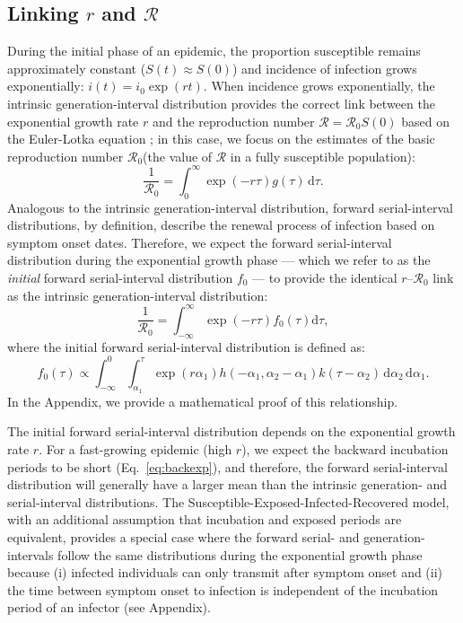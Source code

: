 \documentclass[12pt]{article}
\newcommand{\eref}[1]{Eq.~\ref{eq:#1}}
\newcommand{\Rx}[1]{\ensuremath{{\mathcal R}_{#1}}\xspace}
\newcommand{\Ro}{\Rx{0}}
\newcommand{\RR}{\ensuremath{{\mathcal R}}\xspace}
\newcommand{\dd}[1]{\ensuremath{\, \mathrm{d}#1}}
\newcommand{\dtau}{\dd{\tau}}
\begin{document}
\subsection{Linking $r$ and \RR}

During the initial phase of an epidemic, the proportion susceptible remains approximately constant ($S(t) \approx S(0)$) and incidence of infection grows exponentially: $i(t)=i_0\exp(rt)$.
When incidence grows exponentially, the intrinsic generation-interval distribution provides the correct link between the exponential growth rate $r$ and the reproduction number $\RR=\Ro S(0)$ based on the Euler-Lotka equation \citep{wallinga2007generation};
in this case, we focus on the estimates of the basic reproduction number \Ro (the value of \RR in a fully susceptible population):
\begin{equation}
\frac{1}{\Ro} = \int_0^\infty \exp(-r\tau) g(\tau) \dtau.
\end{equation}
Analogous to the intrinsic generation-interval distribution, 
forward serial-interval distributions, by definition, describe the renewal process of infection based on symptom onset dates.
Therefore, we expect the forward serial-interval distribution during the exponential growth phase --- which we refer to as the \emph{initial} forward serial-interval distribution $f_0$ --- to provide the identical $r$--\Ro link as the intrinsic generation-interval distribution:
\begin{equation}
\frac{1}{\Ro} = \int_{-\infty}^\infty \exp(-r\tau) f_{0}(\tau) \mathrm{d} \tau,
\end{equation}
where the initial forward serial-interval distribution is defined as:
\begin{equation}
f_{0}(\tau) \propto \int_{-\infty}^{0} \int_{\alpha_1}^{\tau} \exp(r \alpha_1) h(-\alpha_1, \alpha_2 - \alpha_1) k(\tau - \alpha_2) \, \mathrm{d}\alpha_2\,\mathrm{d}\alpha_1.
\end{equation}
In the Appendix, we provide a mathematical proof of this relationship.

The initial forward serial-interval distribution depends on the exponential growth rate $r$.
For a fast-growing epidemic (high $r$), we expect the backward incubation periods to be short (\eref{backexp}), and therefore, the forward serial-interval distribution will generally have a larger mean than the intrinsic generation- and serial-interval distributions.
The Susceptible-Exposed-Infected-Recovered model, with an additional assumption that incubation and exposed periods are equivalent, provides a special case where the forward serial- and generation-intervals follow the same distributions during the exponential growth phase because (i) infected individuals can only transmit after symptom onset and (ii) the time between symptom onset to infection is independent of the incubation period of an infector (see Appendix).
\end{document}
